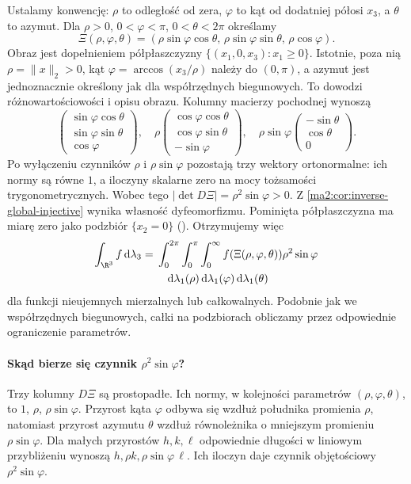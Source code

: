 Ustalamy konwencję: $\rho$ to odległość od zera,
$\varphi$ to kąt od dodatniej półosi $x_3$,
a $\theta$ to azymut. Dla
$\rho>0$, $0<\varphi<\pi$, $0<\theta<2\pi$
określamy
\[
 \Xi(\rho,\varphi,\theta)=
 (\rho\sin\varphi\cos\theta,\,
 \rho\sin\varphi\sin\theta,\,
 \rho\cos\varphi).
\]
Obraz jest dopełnieniem półpłaszczyzny
$\{(x_1,0,x_3):x_1\ge0\}$. Istotnie, poza nią
$\rho=\|x\|_2>0$, kąt
$\varphi=\arccos(x_3/\rho)$ należy do $(0,\pi)$,
a azymut jest jednoznacznie określony jak dla
współrzędnych biegunowych. To dowodzi
różnowartościowości i opisu obrazu.
Kolumny macierzy pochodnej wynoszą
\[
 \begin{pmatrix}
 \sin\varphi\cos\theta\\ \sin\varphi\sin\theta\\ \cos\varphi
 \end{pmatrix},\quad
 \rho\begin{pmatrix}
 \cos\varphi\cos\theta\\ \cos\varphi\sin\theta\\-\sin\varphi
 \end{pmatrix},\quad
 \rho\sin\varphi\begin{pmatrix}-\sin\theta\\\cos\theta\\0
 \end{pmatrix}.
\]
Po wyłączeniu czynników $\rho$ i $\rho\sin\varphi$
pozostają trzy wektory ortonormalne: ich normy
są równe $1$, a iloczyny skalarne zero
na mocy tożsamości trygonometrycznych.
Wobec tego
$|\det D\Xi|=\rho^2\sin\varphi>0$.
Z \ref{ma2:cor:inverse-global-injective}
wynika własność dyfeomorfizmu.
Pominięta półpłaszczyzna ma miarę zero jako
podzbiór $\{x_2=0\}$
().
Otrzymujemy więc
\begin{equation}
\label{ma2:eq:multiple-spherical}
 \begin{split}
 \int_{\R^3} f\,\mathrm d\lambda_3
 ={}&\int_0^{2\pi}\int_0^\pi\int_0^\infty
 f(\Xi(\rho,\varphi,\theta))\rho^2\sin\varphi\\
 &\quad\mathrm d\lambda_1(\rho)\,
 \mathrm d\lambda_1(\varphi)\,
 \mathrm d\lambda_1(\theta)
 \end{split}
\end{equation}
dla funkcji nieujemnych mierzalnych lub całkowalnych.
Podobnie jak we współrzędnych biegunowych,
całki na podzbiorach obliczamy przez
odpowiednie ograniczenie parametrów.

\paragraph{Skąd bierze się czynnik $\rho^2\sin\varphi$?}
Trzy kolumny $D\Xi$ są prostopadłe.
Ich normy, w kolejności parametrów
$(\rho,\varphi,\theta)$, to
$1$, $\rho$, $\rho\sin\varphi$.
Przyrost kąta $\varphi$ odbywa się
wzdłuż południka promienia $\rho$,
natomiast przyrost azymutu $\theta$
wzdłuż równoleżnika o mniejszym promieniu
$\rho\sin\varphi$. Dla małych przyrostów
$h,k,\ell$ odpowiednie długości
w liniowym przybliżeniu wynoszą
$h,\rho k,\rho\sin\varphi\,\ell$.
Ich iloczyn daje czynnik objętościowy
$\rho^2\sin\varphi$.

